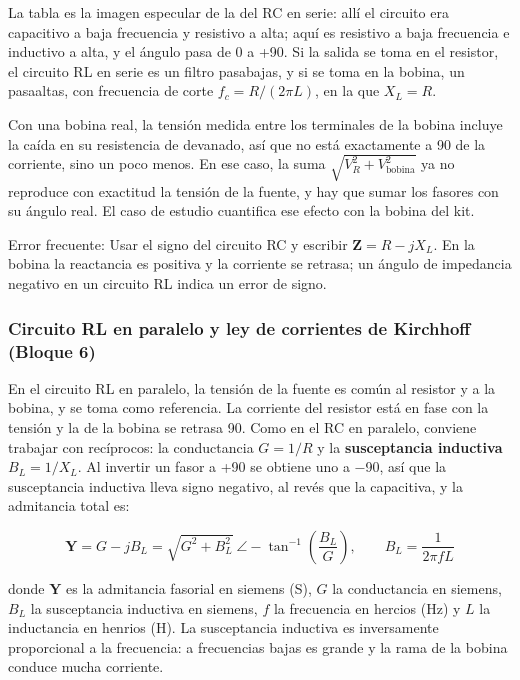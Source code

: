 \documentclass[11pt,letterpaper]{article}
\begin{document}
La tabla es la imagen especular de la del RC en serie: allí el circuito era capacitivo a baja frecuencia y resistivo a alta; aquí es resistivo a baja frecuencia e inductivo a alta, y el ángulo pasa de 0\textdegree{} a +90\textdegree{}. Si la salida se toma en el resistor, el circuito RL en serie es un filtro pasabajas, y si se toma en la bobina, un pasaaltas, con frecuencia de corte $f_c = R/(2\pi L)$, en la que $X_L = R$.

Con una bobina real, la tensión medida entre los terminales de la bobina incluye la caída en su resistencia de devanado, así que no está exactamente a 90\textdegree{} de la corriente, sino un poco menos. En ese caso, la suma $\sqrt{V_R^2 + V_{\mathrm{bobina}}^2}$ ya no reproduce con exactitud la tensión de la fuente, y hay que sumar los fasores con su ángulo real. El caso de estudio cuantifica ese efecto con la bobina del kit.

\begin{nota}{Error frecuente:}
Usar el signo del circuito RC y escribir $\mathbf{Z} = R - jX_L$. En la bobina la reactancia es positiva y la corriente se retrasa; un ángulo de impedancia negativo en un circuito RL indica un error de signo.
\end{nota}

\subsubsection{Circuito RL en paralelo y ley de corrientes de Kirchhoff (Bloque 6)}

En el circuito RL en paralelo, la tensión de la fuente es común al resistor y a la bobina, y se toma como referencia. La corriente del resistor está en fase con la tensión y la de la bobina se retrasa 90\textdegree{}. Como en el RC en paralelo, conviene trabajar con recíprocos: la conductancia $G = 1/R$ y la \textbf{susceptancia inductiva} $B_L = 1/X_L$. Al invertir un fasor a +90\textdegree{} se obtiene uno a \ensuremath{-}90\textdegree{}, así que la susceptancia inductiva lleva signo negativo, al revés que la capacitiva, y la admitancia total es:

\begin{equation}
  \mathbf{Y} = G - jB_L = \sqrt{G^{2} + B_L^{2}}\ \angle -\tan^{-1}\!\left(\frac{B_L}{G}\right), \qquad B_L = \frac{1}{2\pi f L}
\end{equation}

donde $\mathbf{Y}$ es la admitancia fasorial en siemens (S), $G$ la conductancia en siemens, $B_L$ la susceptancia inductiva en siemens, $f$ la frecuencia en hercios (Hz) y $L$ la inductancia en henrios (H). La susceptancia inductiva es inversamente proporcional a la frecuencia: a frecuencias bajas es grande y la rama de la bobina conduce mucha corriente.
\end{document}
